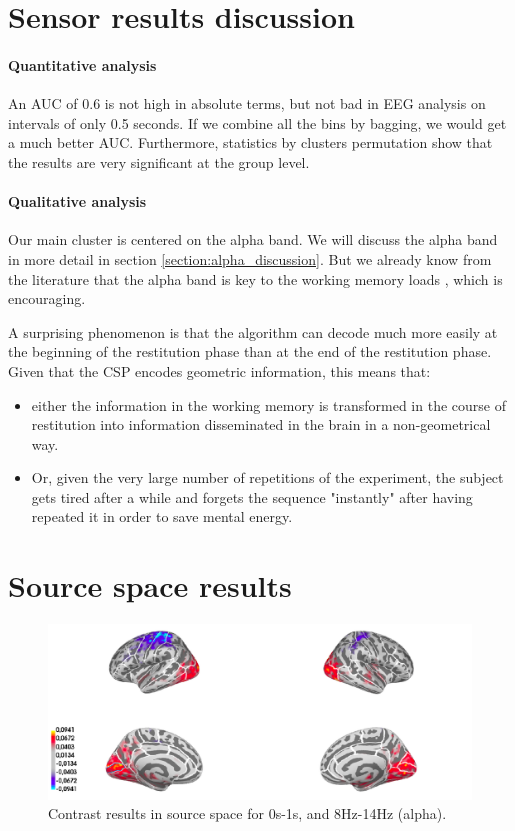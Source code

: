 \section{Sensor results discussion}

\paragraph{Quantitative analysis}
An AUC of 0.6 is not high in absolute terms, but not bad in EEG analysis on intervals of only 0.5 seconds. If we combine all the bins by bagging, we would get a much better AUC. Furthermore, statistics by clusters permutation show that the results are very significant at the group level.

\paragraph{Qualitative analysis}

Our main cluster is centered on the alpha band. We will discuss the alpha band in more detail in section \ref{section:alpha_discussion}. But we already know from the literature that the alpha band is key to the working memory loads \cite{obleser2012adverse}, which is encouraging.

A surprising phenomenon is that the algorithm can decode much more easily at the beginning of the restitution phase than at the end of the restitution phase. Given that the CSP encodes geometric information, this means that:
\begin{itemize}
    \item either the information in the working memory is transformed in the course of restitution into information disseminated in the brain in a non-geometrical way.
    \item Or, given the very large number of repetitions of the experiment, the subject gets tired after a while and forgets the sequence "instantly" after having repeated it in order to save mental energy.
\end{itemize}



\section{Source space results}


\begin{figure}[ht]
    \centering
    \includegraphics[width=15cm]{images_report/source/source_results_3d_cropped.png}
    \caption[Contrast results in the source space (alpha)]%
    {Contrast results in source space for 0s-1s, and 8Hz-14Hz (alpha).}
    \label{results_source_space_alpha}
\end{figure}

